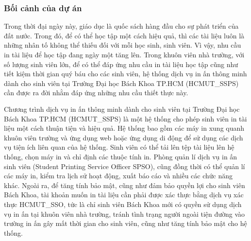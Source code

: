 \documentclass[a4paper]{article}
\theoremstyle{definition}
\begin{document}
\subsubsection{Bối cảnh của dự án}
Trong thời đại ngày này, giáo dục là quốc sách hàng đầu cho sự phát triển của đất nước. Trong đó, để có thể học tập một cách hiệu quả, thì các tài liệu luôn là những nhân tố không thể thiếu đối với mỗi học sinh, sinh viên. Vì vậy, nhu cầu in tài liệu để học tập đang ngày một tăng lên. Trong khuôn viên nhà trường, với số lượng sinh viên lớn, để có thể  đáp ứng nhu cầu in tài liệu học tập cũng như tiết kiệm thời gian quý báu cho các sinh viên, hệ thống dịch vụ in ấn thông minh dành cho sinh viên tại Trường Đại học Bách Khoa TP.HCM (HCMUT\_SSPS) cần được ra đời nhằm đáp ứng những nhu cầu thiết thực này. \par
Chương trình dịch vụ in ấn thông minh dành cho sinh viên tại Trường Đại học Bách Khoa TP.HCM (HCMUT\_SSPS) là một hệ thống cho phép sinh viên in tài liệu một cách thuận tiện và hiệu quả. Hệ thống bao gồm các máy in xung quanh khuôn viên trường và ứng dụng web hoặc ứng dụng di động để sử dụng các dịch vụ tiện ích liên quan của hệ thống. Sinh viên có thể tải lên tệp tài liệu lên hệ thống, chọn máy in và chỉ định các thuộc tính in. Phòng quản lí dịch vụ in ấn sinh viên (Student Printing Service Officer SPSO), cũng đồng thời có thể quản lí các máy in, kiểm tra lịch sử hoạt động, xuất báo cáo và nhiều các chức năng khác. Ngoài ra, để tăng tính bảo mật, cũng như đảm bảo quyền lợi cho sinh viên Bách Khoa, tài khoản muốn in tài liệu cần phải được xác thực bằng dịch vụ xác thực HCMUT\_SSO, tức là chỉ sinh viên Bách Khoa mới có quyền sử dụng dịch vụ in ấn tại khuôn viên nhà trường, tránh tình trạng người ngoài tiện đường vào trường in ấn gây mất thời gian cho sinh viên, cũng như tăng tính bảo mật cho hệ thống. 
\end{document}

